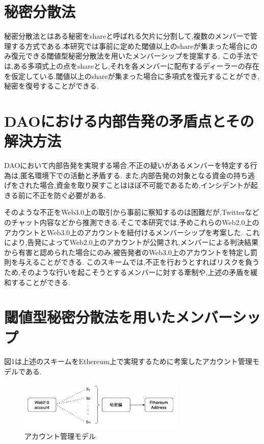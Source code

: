 \documentclass[twocolumn,10pt]{jarticle}
\begin{document}
\section{\normalsize 秘密分散法}
\vspace{-0.2cm}
秘密分散法とはある秘密をshareと呼ばれる欠片に分割して,複数のメンバーで管理する方式である.本研究では事前に定めた閾値以上のshareが集まった場合にのみ復元できる閾値型秘密分散法を用いたメンバーシップを提案する.
この手法では,ある多項式上の点をshareとし,それを各メンバーに配布するディーラーの存在を仮定している.閾値以上のshareが集まった場合に多項式を復元することができ,秘密を復号することができる.

\vspace{-0.55cm}
\section{\normalsize DAOにおける内部告発の矛盾点とその解決方法}
\vspace{-0.2cm}
DAOにおいて内部告発を実現する場合,不正の疑いがあるメンバーを特定する行為は,匿名環境下での活動と矛盾する.
また,内部告発の対象となる資金の持ち逃げをされた場合,資金を取り戻すことはほぼ不可能であるため,インシデントが起きる前に不正を防ぐ必要がある.

そのような不正をWeb3.0上の取引から事前に察知するのは困難だが,Twitterなどのチャット内容などから推測できる.そこで本研究では,予めこれらのWeb2.0上のアカウントとWeb3.0上のアカウントを紐付けるメンバーシップを考案した.
これにより,告発によってWeb2.0上のアカウントが公開され,メンバーによる判決結果から有害と認められた場合にのみ,被告発者のWeb3.0上のアカウントを特定し罰則を与えることができる.
このスキームでは,不正を行おうとすればリスクを負うため,そのような行いを起こそうとするメンバーに対する牽制や,上述の矛盾を緩和することができる.
\vspace{-0.55cm}
\section{\normalsize 閾値型秘密分散法を用いたメンバーシップ}
\vspace{-0.2cm}
図1は上述のスキームをEthereum上で実現するために考案したアカウント管理モデルである.
\begin{figure}[htbp]
  \begin{center}
    \includegraphics[width=80mm]{share.png}
    \caption{アカウント管理モデル}
  \end{center}
\end{figure}
\vspace{-0.55cm}
\end{document}
